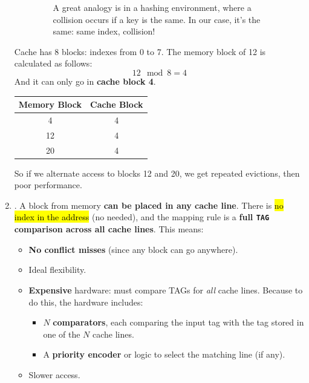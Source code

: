 \begin{enumerate}
\begin{itemize}
\begin{figure}[!htp]
            \caption{A great analogy is in a hashing environment, where a collision occurs if a key is the same. In our case, it's the same: same index, collision!\cite{GFG_CollisionResolutionImage_2025}}
        \end{figure}
    \end{itemize}
    \begin{examplebox}
        Cache has 8 blocks: indexes from 0 to 7. The memory block of 12 is calculated as follows:
        \begin{equation*}
            12 \mod 8 = 4
        \end{equation*}
        And it can only go in \textbf{cache block 4}.
        \begin{center}
            \begin{tabular}{@{} c c @{}}
                \toprule
                Memory Block & Cache Block \\
                \midrule
                4   & 4 \\ [.3em]
                12  & 4 \\ [.3em]
                20  & 4 \\
                \bottomrule
            \end{tabular}
        \end{center}
        So if we alternate access to blocks 12 and 20, we get repeated evictions, then poor performance.
    \end{examplebox}


    \item \label{def: Fully Associative Cache} . A block from memory \textbf{can be placed in any cache line}. There is \hl{no index in the address} (no needed), and the mapping rule is a \textbf{full \texttt{TAG} comparison across all cache lines}. This means:
    \begin{itemize}
        \item[\textcolor{Green3}{\faIcon{check-circle}}] \textbf{No conflict misses} (since any block can go anywhere).
        \item[\textcolor{Green3}{\faIcon{check-circle}}] Ideal flexibility.
        \item[\textcolor{Red2}{\faIcon{times-circle}}] \textbf{Expensive} hardware: must compare TAGs for \emph{all} cache lines. Because to do this, the hardware includes:
        \begin{itemize}
            \item $N$ \textbf{comparators}, each comparing the input tag with the tag stored in one of the $N$ cache lines.
            \item A \textbf{priority encoder} or logic to select the matching line (if any).
        \end{itemize}
        \item[\textcolor{Red2}{\faIcon{times-circle}}] Slower access.
    \end{itemize}



\end{enumerate}
